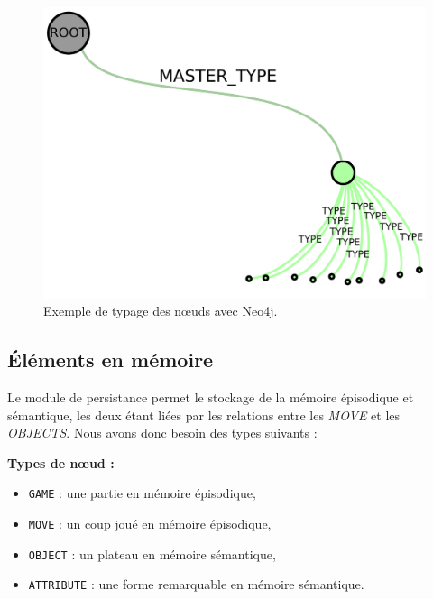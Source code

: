 \begin{figure}[H]
\includegraphics[width=\textwidth]{files/neo4j/example_node_type}
\caption{Exemple de typage des nœuds avec Neo4j.}
\label{example_node_type}
\end{figure}

\subsection{Éléments en mémoire}

Le module de persistance permet le stockage de la mémoire épisodique et sémantique, les deux étant liées par les relations entre les \emph{MOVE} et les \emph{OBJECTS}. Nous avons donc besoin des types suivants : 

\textbf{Types de nœud :}
\begin{itemize}
	\item \texttt{GAME} : une partie en mémoire épisodique, 
	\item \texttt{MOVE} : un coup joué en mémoire épisodique,
	\item \texttt{OBJECT} : un plateau en mémoire sémantique,
	\item \texttt{ATTRIBUTE} : une forme remarquable en mémoire sémantique.
\end{itemize}


